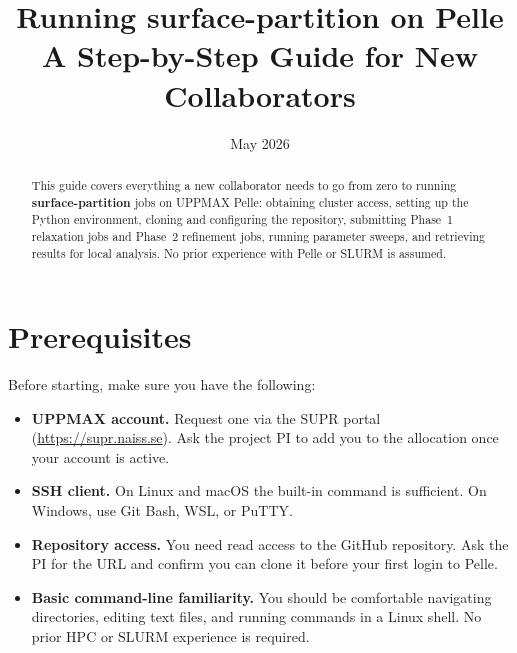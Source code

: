 \documentclass[11pt,a4paper]{article}
\title{%
  \textbf{Running surface-partition on Pelle}\\[0.5em]
  \large A Step-by-Step Guide for New Collaborators
}
\author{}
\date{May 2026}
\begin{document}
\maketitle
\thispagestyle{empty}

\begin{abstract}
This guide covers everything a new collaborator needs to go from zero to running
\textbf{surface-partition} jobs on UPPMAX Pelle: obtaining cluster access,
setting up the Python environment, cloning and configuring the repository,
submitting Phase~1 relaxation jobs and Phase~2 refinement jobs, running
parameter sweeps, and retrieving results for local analysis.
No prior experience with Pelle or SLURM is assumed.
\end{abstract}

\tableofcontents
\newpage

\section{Prerequisites}

Before starting, make sure you have the following:

\begin{itemize}[leftmargin=1.5em]
  \item \textbf{UPPMAX account.}  Request one via the SUPR portal
        (\url{https://supr.naiss.se}).  Ask the project PI to add you to the
        allocation  once your account is active.

  \item \textbf{SSH client.}  On Linux and macOS the built-in 
        command is sufficient.  On Windows, use Git Bash, WSL, or PuTTY.

  \item \textbf{Repository access.}  You need read access to the GitHub
        repository.  Ask the PI for the URL and confirm you can clone it
        before your first login to Pelle.

  \item \textbf{Basic command-line familiarity.}  You should be comfortable
        navigating directories, editing text files, and running commands in a
        Linux shell.  No prior HPC or SLURM experience is required.
\end{itemize}

\end{document}

